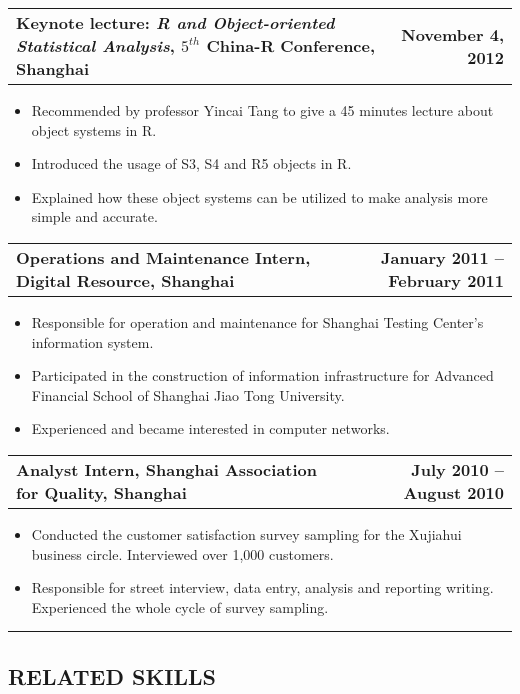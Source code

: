 \documentclass[10pt]{article}
\makeatletter
\newcommand{\headerrow}[2]
{\begin{tabular*}{\linewidth}{l@{\extracolsep{\fill}}r}
	#1 &
	#2 \\
\end{tabular*}}
\makeatother
\begin{document}
\noindent\headerrow
	{\textbf{Keynote lecture: \emph{R and Object-oriented Statistical Analysis}, $5^{th}$ China-R Conference, Shanghai}}
	{\textbf{November 4, 2012}}
\begin{itemize}[topsep=2pt, itemsep=-2pt]
    \setlength{\itemsep}{-2pt}
	\item Recommended by professor Yincai Tang to give a 45 minutes lecture about object systems in R.
	\item Introduced the usage of S3, S4 and R5 objects in R.
	\item Explained how these object systems can be utilized to make analysis more simple and accurate.
\end{itemize}

\noindent\headerrow
	{\textbf{Operations and Maintenance Intern, Digital Resource, Shanghai}}
	{\textbf{January 2011 – February 2011}}
\begin{itemize}[topsep=2pt, itemsep=-2pt]
    \setlength{\itemsep}{-2pt}
	\item Responsible for operation and maintenance for Shanghai Testing Center's information system.
	\item Participated in the construction of information infrastructure for Advanced Financial School of Shanghai Jiao Tong University.
	\item Experienced and became interested in computer networks.
\end{itemize}

\noindent\headerrow
	{\textbf{Analyst Intern, Shanghai Association for Quality, Shanghai}}
	{\textbf{July 2010 – August 2010}}
\begin{itemize}[topsep=2pt, itemsep=-2pt]
	\item Conducted the customer satisfaction survey sampling for the Xujiahui business circle. Interviewed over 1,000 customers.
	\item Responsible for street interview, data entry, analysis and reporting writing. Experienced the whole cycle of survey sampling.
\end{itemize}

\vspace{0.2em}
\hrule
\vspace{-1em}

\vspace{-1em}
\subsection*{\centering RELATED SKILLS}
\vspace{-.6em}
\end{document}
